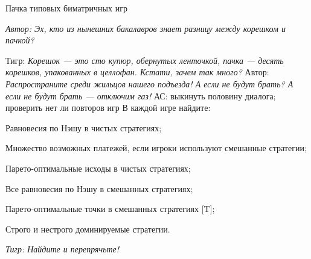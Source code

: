 \begin{problem}
 Пачка типовых биматричных игр\par
{\it Автор:  Эх, кто из нынешних бакалавров знает разницу между корешком и пачкой?}\par
Тигр: {\it Корешок --- это сто купюр, обернутых ленточкой, пачка --- десять корешков, упакованных в целлофан. Кстати, зачем так много? }
Автор: {\it Распространите среди жильцов нашего подъезда! А если не будут брать? А если не будут брать --- отключим газ!}
{\red АС: выкинуть половину диалога; проверить нет ли повторов игр}
В каждой игре найдите: \par
Равновесия по Нэшу в чистых стратегиях;\par
Множество возможных платежей, если игроки используют смешанные стратегии;\par
Парето-оптимальные исходы в чистых стратегиях;\par
Все равновесия по Нэшу в смешанных стратегиях;\par
Парето-оптимальные точки в смешанных стратегиях [T];\par
Строго и нестрого доминируемые стратегии.\par
{\it Тигр: Найдите и перепрячьте!}\par


\end{problem}
